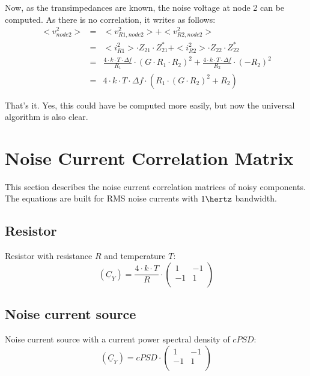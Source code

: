 Now, as the transimpedances are known, the noise voltage
at node 2 can be computed. As there is no correlation, it writes
as follows:
\begin{eqnarray}
<v_{node2}^2> & = & <v_{R1,node2}^2> + <v_{R2,node2}^2> \\
  & = & <i_{R1}^2>\cdot Z_{21}\cdot Z_{21}^* + <i_{R2}^2>\cdot Z_{22}\cdot Z_{22}^* \\
  & = & \frac{4\cdot k\cdot T\cdot \Delta f}{R_1} \cdot (G\cdot R_1\cdot R_2)^2 +
        \frac{4\cdot k\cdot T\cdot \Delta f}{R_2} \cdot (-R_2)^2 \\
  & = & 4\cdot k\cdot T\cdot \Delta f\cdot \left( R_1\cdot (G\cdot R_2)^2 + R_2 \right)
\end{eqnarray}

That's it. Yes, this could have be computed more easily, but now
the universal algorithm is also clear.

\section{Noise Current Correlation Matrix}

This section describes the noise current correlation matrices of noisy
components.  The equations are built for RMS noise currents with
$1\hertz$ bandwidth.

\subsection{Resistor}

Resistor with resistance $R$ and temperature $T$:
\begin{equation}
(\underline{C}_Y) = \frac{4\cdot k\cdot T}{R} \cdot
\begin{pmatrix}
 1 & -1 \\
-1 &  1 \\
\end{pmatrix}
\end{equation}

\subsection{Noise current source}

Noise current source with a current power spectral density of $cPSD$:
\begin{equation}
(\underline{C}_Y) = cPSD \cdot
\begin{pmatrix}
 1 & -1 \\
-1 &  1 \\
\end{pmatrix}
\end{equation}

